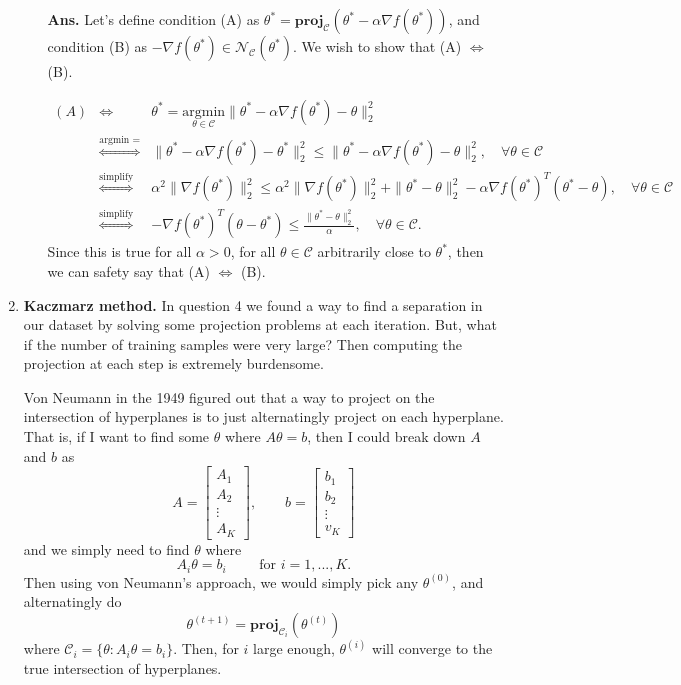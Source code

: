 \documentclass{article}
\newcommand{\argmin}[1]{\underset{#1}{\text{argmin}}}
\newcommand{\mN}{\mathcal N}
\newcommand{\mC}{\mathcal C}
\newcommand{\proj}{\mathbf{proj}}
\newcommand{\bmat}{\left[\begin{matrix}}
\newcommand{\emat}{\end{matrix}\right]}
\newcommand{\showsolution}[1]{\textbf{Ans.} \;#1}
\begin{document}
\begin{enumerate}
\begin{enumerate}
\showsolution{
Let's define condition (A) as $\theta^* = \proj_{\mC}(\theta^*-\alpha\nabla f(\theta^*))$, and condition (B) as $-\nabla f(\theta^*)\in \mN_\mC(\theta^*)$. We wish to show that (A) $\iff$ (B).

\begin{eqnarray*}
(A) &\iff & \theta^* = \argmin{\theta\in \mC} \|\theta^*-\alpha \nabla f(\theta^*)-\theta\|_2^2\\
&\overset{\text{argmin = it's a minimum}}{\iff}& \|\theta^*-\alpha \nabla f(\theta^*)-\theta^*\|_2^2 \leq \|\theta^*-\alpha \nabla f(\theta^*)-\theta\|_2^2, \quad \forall \theta \in \mC\\
&\overset{\text{simplify}}{\iff} & \alpha^2 \|\nabla f(\theta^*)\|_2^2 \leq \alpha^2 \|\nabla f(\theta^*)\|_2^2 + \|\theta^*-\theta\|_2^2 - \alpha \nabla f(\theta^*)^T(\theta^*-\theta) , \quad \forall \theta \in \mC\\
&\overset{\text{simplify}}{\iff} & -\nabla f(\theta^*)^T(\theta-\theta^*) \leq  \frac{\|\theta^*-\theta\|_2^2 }{\alpha}, \quad \forall \theta \in \mC.
\end{eqnarray*} 
Since this is true for all $\alpha > 0$, for all $\theta\in \mC$ arbitrarily close to $\theta^*$, then we can safety say that (A) $\iff$ (B).

}

\end{enumerate}


\item \textbf{Kaczmarz method.} In question 4 we found a way to find a separation in our dataset by solving some projection problems at each iteration. But, what if the number of training samples were very large? Then computing the projection at each step is extremely burdensome.

Von Neumann in the 1949 figured out that a way to project on the intersection of hyperplanes is to just alternatingly project on each hyperplane. That is, if I want to find some $\theta$ where $A\theta = b$, then I could break down $A$ and $b$ as 
\[
A = \bmat A_1 \\ A_2 \\ \vdots \\ A_K \emat, \qquad b = \bmat b_1 \\ b_2 \\ \vdots \\ v_K\emat
\]
and we simply need to find $\theta$ where 
\[
A_i \theta = b_i \qquad \text{ for } i = 1,...,K.
\]
Then using von Neumann's approach, we would simply pick any $\theta^{(0)}$, and alternatingly do
\[
\theta^{(t+1)} = \proj_{\mC_i} (\theta^{(t)})
\]
where $\mC_i = \{\theta : A_i \theta = b_i\}$. Then, for $i$ large enough, $\theta^{(i)}$ will converge to the true intersection of hyperplanes.


\end{enumerate}
\end{document}
